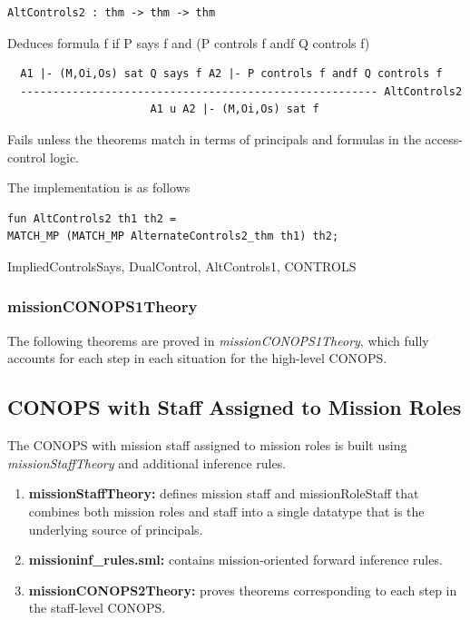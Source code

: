 \documentclass[10pt,twoside]{article}
\begin{document}
\begin{verbatim}
AltControls2 : thm -> thm -> thm
\end{verbatim}

\SYNOPSIS 
Deduces formula f if P says f and (P controls f andf Q controls f)

\DESCRIBE

\begin{scriptsize}
\begin{verbatim}
  A1 |- (M,Oi,Os) sat Q says f A2 |- P controls f andf Q controls f
  ------------------------------------------------------- AltControls2
                      A1 u A2 |- (M,Oi,Os) sat f
\end{verbatim}
\end{scriptsize}

\FAILURE
Fails unless the theorems match in terms of principals and formulas
in the access-control logic.

\IMPLEMENTATION
The implementation is as follows
\begin{holboxed}
\begin{verbatim}
fun AltControls2 th1 th2 =
MATCH_MP (MATCH_MP AlternateControls2_thm th1) th2;
\end{verbatim}
\end{holboxed}

\SEEALSO
ImpliedControlsSays, DualControl, AltControls1, CONTROLS
\ENDDOC
\subsubsection{missionCONOPS1Theory}
\label{sec:missionCONOPS1Theory}

The following theorems are proved in \emph{missionCONOPS1Theory},
which fully accounts for each step in each situation for the
high-level CONOPS.

\HOLmissionCONOPSOneTheorems
\subsection{CONOPS with Staff Assigned to Mission Roles}
\label{sec:conops-with-assigned-staff}

The CONOPS with mission staff assigned to mission roles is built using
\emph{missionStaffTheory} and additional inference rules.
\begin{enumerate}
\item \textbf{missionStaffTheory:} defines mission staff and
  missionRoleStaff that combines both mission roles and staff into a
  single datatype that is the underlying source of principals.
\item \textbf{missioninf\_rules.sml:} contains mission-oriented
  forward inference rules.
\item \textbf{missionCONOPS2Theory:} proves theorems corresponding to
  each step in the staff-level CONOPS.
\end{enumerate}
\end{document}
